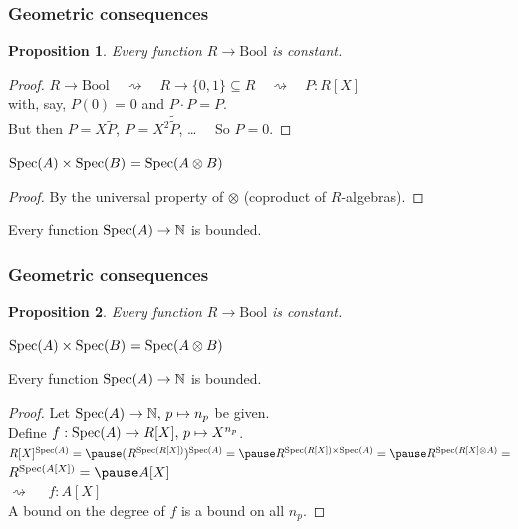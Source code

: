 \documentclass[aspectratio=1610]{beamer}
\newtheorem{proposition}{Proposition}
\begin{document}
\begin{frame}
  \frametitle{Geometric consequences}

  \begin{proposition}
    Every function $R \to \mathrm{Bool}$ is constant.
  \end{proposition}
  \begin{proof}
    \pause%
    $R \to \mathrm{Bool}
    \quad\rightsquigarrow\quad R \to \{0, 1\} \subseteq R
    \quad\rightsquigarrow\quad P : R[X]$\\
    \pause%
    with, say, $P(0) = 0$ and $P \cdot P = P$.\\
    \pause%
    But then $P = X\widetilde{P}$, \pause%
    $P = X^2\widetilde{\widetilde{P}}$, \dots$\quad$ So $P = 0$.
  \end{proof}

  \pause%
  \begin{lemma}
    $\operatorname{Spec}(A) \times \operatorname{Spec}(B) = \operatorname{Spec}(A \otimes B)$
  \end{lemma}
  \begin{proof}
    By the universal property of $\otimes$ (coproduct of $R$-algebras).
  \end{proof}

  \pause%
  \begin{theorem}
    Every function $\operatorname{Spec}(A) \to \mathbb{N}$ is bounded.
  \end{theorem}
\end{frame}

\begin{frame}
  \frametitle{Geometric consequences}

  \begin{proposition}
    Every function $R \to \mathrm{Bool}$ is constant.
  \end{proposition}

  \begin{lemma}
    $\operatorname{Spec}(A) \times \operatorname{Spec}(B) = \operatorname{Spec}(A \otimes B)$
  \end{lemma}

  \begin{theorem}
    Every function $\operatorname{Spec}(A) \to \mathbb{N}$ is bounded.
  \end{theorem}
  \begin{proof}
    Let $\operatorname{Spec}(A) \to \mathbb{N},\, p \mapsto n_p$ be given.\\
    \pause%
    Define $f : \operatorname{Spec}(A) \to R[X],\, p \mapsto X^{n_p}$.\\
    \pause%
    $R[X]^{\Spec(A)} = \pause
    (R^{\Spec(R[X])})^{\Spec(A)} = \pause
    R^{\Spec(R[X]) \times \Spec(A)} = \pause
    R^{\Spec(R[X] \otimes A)} =$\\
    \pause%
    $R^{\Spec(A[X])} = \pause A[X]$\\
    \pause%
    $\rightsquigarrow\quad$ $f : A[X]$\\
    \pause%
    A bound on the degree of $f$ is a bound on all $n_p$.
  \end{proof}
\end{frame}
\end{document}
